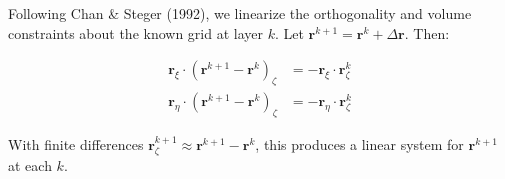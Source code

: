 \documentclass[11pt,a4paper]{report}
\newcommand{\rvec}{\bm{r}}
\begin{document}
Following Chan \& Steger (1992), we linearize the orthogonality and volume constraints about the known grid at layer $k$. Let $\rvec^{k+1} = \rvec^k + \Delta \rvec$. Then:

\begin{align}
    \rvec_\xi \cdot (\rvec^{k+1} - \rvec^k)_\zeta &= -\rvec_\xi \cdot \rvec_\zeta^k \\
    \rvec_\eta \cdot (\rvec^{k+1} - \rvec^k)_\zeta &= -\rvec_\eta \cdot \rvec_\zeta^k
\end{align}

With finite differences $\rvec_\zeta^{k+1} \approx \rvec^{k+1} - \rvec^k$, this produces a linear system for $\rvec^{k+1}$ at each $k$.
\end{document}
